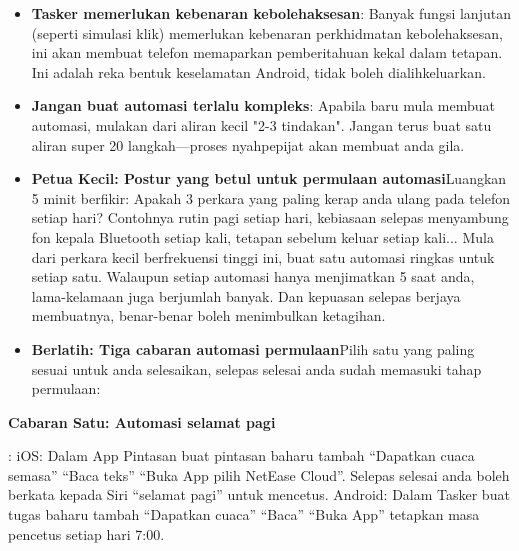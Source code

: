 \begin{itemize}
  \item \textbf{Tasker memerlukan kebenaran kebolehaksesan}: Banyak fungsi lanjutan (seperti simulasi klik) memerlukan kebenaran perkhidmatan kebolehaksesan, ini akan membuat telefon memaparkan pemberitahuan kekal dalam tetapan. Ini adalah reka bentuk keselamatan Android, tidak boleh dialihkeluarkan.
  \item \textbf{Jangan buat automasi terlalu kompleks}: Apabila baru mula membuat automasi, mulakan dari aliran kecil "2-3 tindakan". Jangan terus buat satu aliran super 20 langkah—proses nyahpepijat akan membuat anda gila.
  \item \textbf{Petua Kecil: Postur yang betul untuk permulaan automasi}Luangkan 5 minit berfikir: Apakah 3 perkara yang paling kerap anda ulang pada telefon setiap hari? Contohnya rutin pagi setiap hari, kebiasaan selepas menyambung fon kepala Bluetooth setiap kali, tetapan sebelum keluar setiap kali... Mula dari perkara kecil berfrekuensi tinggi ini, buat satu automasi ringkas untuk setiap satu. Walaupun setiap automasi hanya menjimatkan 5 saat anda, lama-kelamaan juga berjumlah banyak. Dan kepuasan selepas berjaya membuatnya, benar-benar boleh menimbulkan ketagihan.
  \item \textbf{Berlatih: Tiga cabaran automasi permulaan}Pilih satu yang paling sesuai untuk anda selesaikan, selepas selesai anda sudah memasuki tahap permulaan:
\end{itemize}

\textbf{Cabaran Satu: Automasi selamat pagi}\par

: iOS: Dalam App Pintasan buat pintasan baharu tambah “Dapatkan cuaca semasa” “Baca teks” “Buka App pilih NetEase Cloud”. Selepas selesai anda boleh berkata kepada Siri “selamat pagi” untuk mencetus. Android: Dalam Tasker buat tugas baharu tambah “Dapatkan cuaca” “Baca” “Buka App” tetapkan masa pencetus setiap hari 7:00.

